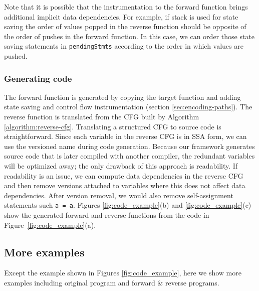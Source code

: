 Note that it is possible that the instrumentation to the forward function brings additional implicit data dependencies. 
For example, if stack is used for state saving the order of values popped in the reverse function should be opposite of the order of pushes in the forward function. 
In this case, we can order those state saving statements in \texttt{pendingStmts} according to the order in which values are pushed.


\subsubsection{Generating code} 
The forward function is generated by copying the target function and adding state saving and control flow instrumentation (section \ref{sec:encoding-paths}). 
The reverse function is translated from the CFG built by Algorithm \ref{algorithm:reverse-cfg}. 
Translating a structured CFG to source code is straightforward. 
Since each variable in the reverse CFG is in SSA form, we can use the versioned name during code generation. 
Because our framework generates source code that is later compiled with another compiler, the redundant variables will be optimized away; the only drawback of this approach is readability.
If readability is an issue, we can compute data dependencies in the reverse CFG and then remove versions attached to variables where this does not affect data dependencies.
After version removal, we would also remove self-assignment statements such \texttt{a = a}.
Figures \ref{fig:code_example}(b) and \ref{fig:code_example}(c) show the generated forward and reverse functions from the code in Figure~\ref{fig:code_example}(a).



\subsection{More examples}

Except the example shown in Figures \ref{fig:code_example}, here we show more examples including original program and forward \& reverse programs. 

